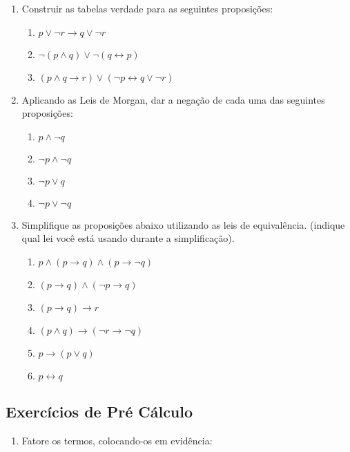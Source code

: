 \documentclass[a4paper,12pt]{article}
\newcommand{\NOT}{\neg}
\newcommand{\IMP}{\to}
\newcommand{\AND}{\wedge}
\newcommand{\OR}{\vee}
\newcommand{\BIMPLI}{\leftrightarrow}
\begin{document}
\begin{center}
\begin{enumerate}
\begin{enumerate}
\end{enumerate}

 \item Construir as tabelas verdade para as seguintes proposições:

\begin{enumerate}

\item  $ p \OR \NOT r \IMP q \OR \NOT r $
\item  $ \NOT(p \AND q) \OR \NOT(q \BIMPLI p)$
\item  $(p \AND q \IMP r) \OR (\NOT p \BIMPLI q \OR \NOT r)$

\end{enumerate}


\item Aplicando as Leis de Morgan, dar a negação de cada uma das seguintes proposições:

\begin{enumerate}

\item $p \AND \NOT q$
\item $\NOT p \AND\NOT q$
\item $\NOT p \OR q$
\item $\NOT p  \OR\NOT q$

\end{enumerate}

\item Simplifique as proposições abaixo utilizando as leis de equivalência. (indique qual lei você está usando durante a simplificação).

\begin{enumerate}

\item $p \AND (p \IMP q) \AND (p \IMP\NOT q)$
\item $(p \IMP q) \AND (\NOT p \IMP q)$
\item $(p \IMP q) \IMP r$
\item $(p \AND q) \IMP (\NOT r \IMP \NOT q)$
\item $p \IMP (p \OR q)$
\item $p \BIMPLI q$

\end{enumerate} \end{enumerate}



\newpage
\begin{center}
\section{Exercícios de Pré Cálculo}
\end{center}
\begin{enumerate} \item Fatore os termos, colocando-os em evidência:


\end{enumerate}
\end{center}
\end{document}
